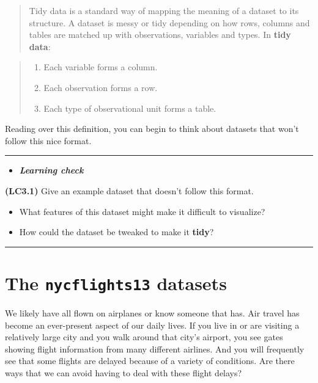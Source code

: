 \documentclass[]{tufte-book}
\providecommand{\tightlist}{%
  \setlength{\itemsep}{0pt}\setlength{\parskip}{0pt}}
\newenvironment{rmdblock}[1]
  {\begin{shaded*}
  \begin{itemize}
  \renewcommand{\labelitemi}{
    \raisebox{-.7\height}[0pt][0pt]{
    }
  }
  \item
  }
  {
  \end{itemize}
  \end{shaded*}
  }
\newenvironment{learncheck}
  {\begin{rmdblock}{warning}}
  {\end{rmdblock}}
\begin{document}
\begin{quote}
Tidy data is a standard way of mapping the meaning of a dataset to its
structure. A dataset is messy or tidy depending on how rows, columns and
tables are matched up with observations, variables and types. In
\textbf{tidy data}:
\end{quote}

\begin{quote}
\begin{enumerate}
\def\labelenumi{\arabic{enumi}.}
\tightlist
\item
  Each variable forms a column.
\item
  Each observation forms a row.
\item
  Each type of observational unit forms a table.
\end{enumerate}
\end{quote}

Reading over this definition, you can begin to think about datasets that
won't follow this nice format.

\begin{center}\rule{0.5\linewidth}{\linethickness}\end{center}

\begin{learncheck}
\textbf{\emph{Learning check}}
\end{learncheck}

\textbf{(LC3.1)} Give an example dataset that doesn't follow this
format.

\begin{itemize}
\tightlist
\item
  What features of this dataset might make it difficult to visualize?\\
\item
  How could the dataset be tweaked to make it \textbf{tidy}?
\end{itemize}

\begin{center}\rule{0.5\linewidth}{\linethickness}\end{center}

\section{\texorpdfstring{The \texttt{nycflights13}
datasets}{The nycflights13 datasets}}\label{the-nycflights13-datasets}

We likely have all flown on airplanes or know someone that has. Air
travel has become an ever-present aspect of our daily lives. If you live
in or are visiting a relatively large city and you walk around that
city's airport, you see gates showing flight information from many
different airlines. And you will frequently see that some flights are
delayed because of a variety of conditions. Are there ways that we can
avoid having to deal with these flight delays?
\end{document}
